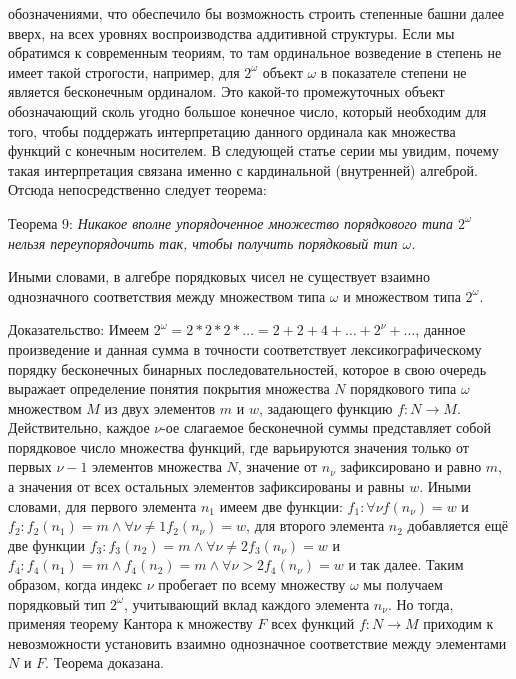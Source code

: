 \documentclass[12pt]{article}
\begin{document}
обозначениями, что обеспечило бы возможность строить степенные башни далее вверх, на всех уровнях воспроизводства аддитивной структуры. Если мы обратимся к современным теориям, то там ординальное возведение в степень не имеет такой строгости, например, для $2^{\omega}$ объект $\omega$ в показателе степени не является бесконечным ординалом. Это какой-то промежуточных объект обозначающий сколь угодно большое конечное число, который необходим для того, чтобы поддержать интерпретацию данного ординала как множества функций с конечным носителем. В следующей статье серии мы увидим, почему такая интерпретация связана именно с кардинальной (внутренней) алгеброй. Отсюда непосредственно следует теорема:

Теорема 9: {\sl Никакое вполне упорядоченное множество порядкового типа $2^{\omega}$ нельзя переупорядочить так, чтобы получить порядковый тип $\omega$.}

Иными словами, в алгебре порядковых чисел не существует взаимно однозначного соответствия между множеством типа $\omega$ и множеством типа $2^{\omega}$.

Доказательство: 
Имеем $2^{\omega} = 2*2*2*\dots = 2 + 2 + 4 + \dots + 2^{\nu} + \dots$, данное произведение и данная сумма в точности соответствует лексикографическому порядку бесконечных бинарных последовательностей, которое в свою очередь выражает определение понятия покрытия множества $N$ порядкового типа $\omega$ множеством $M$ из двух элементов $m$ и $w$, задающего функцию $f : N \to M$. Действительно, каждое $\nu$-ое слагаемое бесконечной суммы представляет собой порядковое число множества функций, где варьируются значения только от первых $\nu - 1$ элементов множества $N$, значение от $n_{\nu}$ зафиксировано и равно $m$, а значения от всех остальных элементов зафиксированы и равны $w$. Иными словами, для первого элемента $n_1$ имеем две функции: $f_1: \forall \nu f(n_{\nu}) = w$ и $f_2: f_2(n_1) = m \wedge \forall \nu \neq 1 f_2(n_{\nu}) = w$, для второго элемента $n_2$ добавляется ещё две функции $f_3: f_3(n_2) = m \wedge \forall \nu \neq 2 f_3(n_{\nu}) = w$ и $f_4: f_4(n_1) = m \wedge f_4(n_2) = m \wedge \forall \nu > 2 f_4(n_{\nu}) = w$ и так далее. Таким образом, когда индекс $\nu$ пробегает по всему множеству $\omega$ мы получаем порядковый тип $2^{\omega}$, учитывающий вклад каждого элемента $n_{\nu}$. Но тогда, применяя теорему Кантора к множеству $F$ всех функций $f: N \to M$ приходим к невозможности установить взаимно однозначное соответствие между элементами $N$ и $F$. Теорема доказана.
\end{document}
